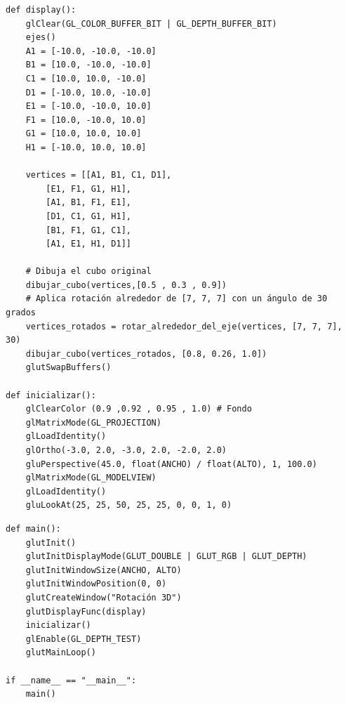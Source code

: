 \documentclass[a4paper]{article}
\begin{document}
\begin{center}
\begin{mycodeboxl}
\begin{lstlisting}
def display():
    glClear(GL_COLOR_BUFFER_BIT | GL_DEPTH_BUFFER_BIT)
    ejes()
    A1 = [-10.0, -10.0, -10.0]
    B1 = [10.0, -10.0, -10.0]
    C1 = [10.0, 10.0, -10.0]
    D1 = [-10.0, 10.0, -10.0]
    E1 = [-10.0, -10.0, 10.0]
    F1 = [10.0, -10.0, 10.0]
    G1 = [10.0, 10.0, 10.0]
    H1 = [-10.0, 10.0, 10.0]

    vertices = [[A1, B1, C1, D1],
        [E1, F1, G1, H1],
        [A1, B1, F1, E1],
        [D1, C1, G1, H1],
        [B1, F1, G1, C1],
        [A1, E1, H1, D1]]

    # Dibuja el cubo original 
    dibujar_cubo(vertices,[0.5 , 0.3 , 0.9])
    # Aplica rotación alrededor de [7, 7, 7] con un ángulo de 30 grados
    vertices_rotados = rotar_alrededor_del_eje(vertices, [7, 7, 7], 30)
    dibujar_cubo(vertices_rotados, [0.8, 0.26, 1.0])
    glutSwapBuffers()

def inicializar():
    glClearColor (0.9 ,0.92 , 0.95 , 1.0) # Fondo
    glMatrixMode(GL_PROJECTION)
    glLoadIdentity()
    glOrtho(-3.0, 2.0, -3.0, 2.0, -2.0, 2.0)
    gluPerspective(45.0, float(ANCHO) / float(ALTO), 1, 100.0)
    glMatrixMode(GL_MODELVIEW)
    glLoadIdentity()
    gluLookAt(25, 25, 50, 25, 25, 0, 0, 1, 0)
\end{lstlisting}
\end{mycodeboxl}
\end{center}


\begin{center}
\begin{mycodeboxl}
\begin{lstlisting}
def main():
    glutInit()
    glutInitDisplayMode(GLUT_DOUBLE | GLUT_RGB | GLUT_DEPTH)
    glutInitWindowSize(ANCHO, ALTO)
    glutInitWindowPosition(0, 0)
    glutCreateWindow("Rotación 3D")
    glutDisplayFunc(display)
    inicializar()
    glEnable(GL_DEPTH_TEST)
    glutMainLoop()

if __name__ == "__main__":
    main()
\end{lstlisting}
\end{mycodeboxl}
\end{center}
\end{document}
